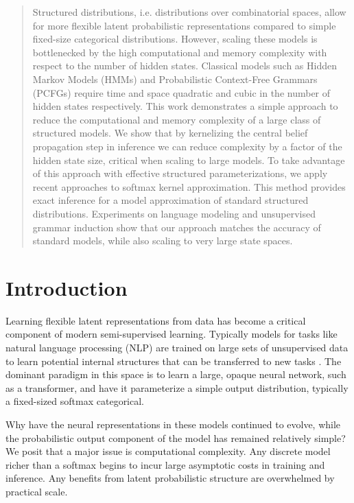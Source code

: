 \documentclass{article}
\begin{document}
\begin{abstract}
  Structured distributions, i.e. distributions over combinatorial
  spaces, allow for more flexible latent probabilistic representations
  compared to simple fixed-size categorical distributions. However,
  scaling these models is bottlenecked by the high computational and
  memory complexity with respect to the number of hidden states.  Classical models
  such as Hidden Markov Models (HMMs) and Probabilistic Context-Free
  Grammars (PCFGs) require time and space quadratic and cubic in the
  number of hidden states respectively.  This work demonstrates a
  simple approach to reduce the computational and memory complexity of
  a large class of structured models. We show that by kernelizing the
  central belief propagation step in inference we can reduce
  complexity by a factor of the hidden state size, critical when scaling to
  large models. To take advantage of this approach with effective
  structured parameterizations, we apply recent approaches to softmax
  kernel approximation. This method provides exact inference for a
  model approximation of standard structured distributions.
  Experiments on language modeling and unsupervised grammar induction
  show that our approach matches the accuracy of standard models, 
  while also scaling to very large state spaces.
\end{abstract}

\section{Introduction}


Learning flexible latent representations from data has become a
critical component of modern semi-supervised learning. Typically
models for tasks like natural language processing (NLP) are trained on
large sets of unsupervised data to learn potential internal structures
that can be transferred to new tasks \citep{devlin2018bert,radford2019language,liu2019roberta}. The dominant paradigm in this
space is to learn a large, opaque neural network, such as a
transformer, and have it parameterize a simple output distribution,
typically a fixed-sized softmax categorical.

Why have the neural representations in these models continued to evolve, while the probabilistic output component of the model has remained relatively
simple? We posit that a major issue is computational complexity.  Any
discrete model richer than a softmax begins to incur large asymptotic
costs in training and inference. Any benefits from latent probabilistic
structure are overwhelmed by practical scale.
\end{document}
